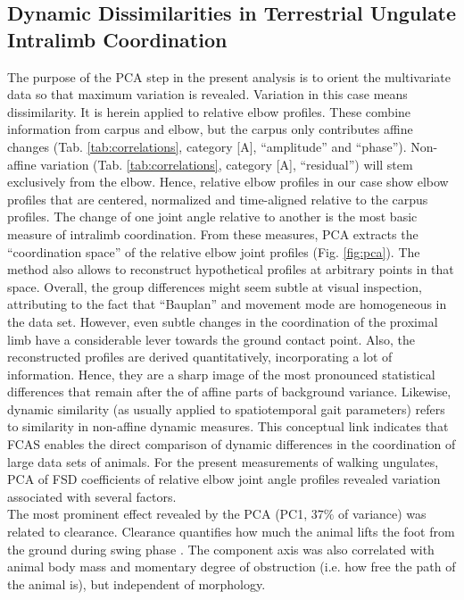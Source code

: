 \subsection{Dynamic Dissimilarities in Terrestrial Ungulate Intralimb Coordination}
The purpose of the PCA step in the present analysis is to orient the multivariate data so that maximum variation is revealed.
Variation in this case means dissimilarity.
It is herein applied to relative elbow profiles.
These combine information from carpus and elbow, but the carpus only contributes affine changes (Tab. \ref{tab:correlations}, category [A], ``amplitude'' and ``phase'').
Non-affine variation (Tab. \ref{tab:correlations}, category [A], ``residual'') will stem exclusively from the elbow.
Hence, relative elbow profiles in our case show elbow profiles that are centered, normalized and time-aligned relative to the carpus profiles.
The change of one joint angle relative to another is the most basic measure of intralimb coordination.
From these measures, PCA extracts the ``coordination space'' of the relative elbow joint profiles (Fig. \ref{fig:pca}).
The method also allows to reconstruct hypothetical profiles at arbitrary points in that space.
Overall, the group differences might seem subtle at visual inspection, attributing to the fact that ``Bauplan'' and movement mode are homogeneous in the data set.
However, even subtle changes in the coordination of the proximal limb have a considerable lever towards the ground contact point.
Also, the reconstructed profiles are derived quantitatively, incorporating a lot of information.
Hence, they are a sharp image of the most pronounced statistical differences that remain after the  of affine parts of background variance.
Likewise, dynamic similarity (as usually applied to spatiotemporal gait parameters) refers to similarity in non-affine dynamic measures.
This conceptual link indicates that FCAS enables the direct comparison of dynamic differences in the coordination of large data sets of animals.
For the present measurements of walking ungulates, PCA of FSD coefficients of relative elbow joint angle profiles revealed variation associated with several factors.
\smallskip\\The most prominent effect revealed by the PCA (PC1, $37\%$ of variance) was related to clearance.
Clearance quantifies how much the animal lifts the foot from the ground during swing phase \citep{Austin1999,MacLellan2010,Perrot2011}.
The component axis was also correlated with animal body mass and momentary degree of obstruction (i.e. how free the path of the animal is), but independent of morphology.
